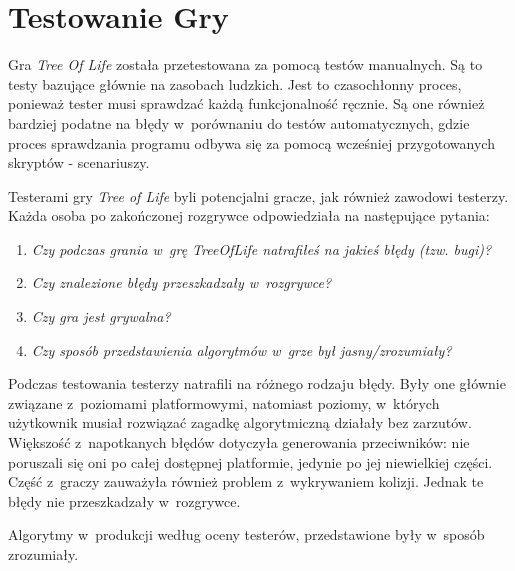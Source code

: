 \documentclass[12pt,a4paper,oneside]{book}
\theoremstyle{definition}
\numberwithin{equation}{chapter}
\begin{document}
\section{Testowanie Gry}
\par Gra \textit{Tree Of Life} została przetestowana za pomocą testów manualnych. Są to testy bazujące głównie na zasobach ludzkich. Jest to czasochłonny proces, ponieważ tester musi sprawdzać każdą funkcjonalność ręcznie. Są one również bardziej podatne na błędy w~porównaniu do testów automatycznych, gdzie proces sprawdzania programu odbywa się za pomocą wcześniej przygotowanych skryptów - scenariuszy.
\par Testerami gry \textit{Tree of Life} byli potencjalni gracze, jak również zawodowi testerzy. Każda osoba po zakończonej rozgrywce odpowiedziała na następujące pytania:
\begin{enumerate}
    \item \textit{Czy podczas grania w~grę TreeOfLife natrafiłeś na jakieś błędy (tzw. bugi)?}
    \item \textit{Czy znalezione błędy przeszkadzały w~rozgrywce?}
    \item \textit{Czy gra jest grywalna?}
    \item \textit{Czy sposób przedstawienia algorytmów w~grze był jasny/zrozumiały?}
\end{enumerate}
\par Podczas testowania testerzy natrafili na różnego rodzaju błędy. Były one głównie związane z~poziomami platformowymi, natomiast poziomy, w~których użytkownik musiał rozwiązać zagadkę algorytmiczną działały bez zarzutów. Większość z~napotkanych błędów dotyczyła generowania przeciwników: nie poruszali się oni po całej dostępnej platformie, jedynie po jej niewielkiej części. Część z~graczy zauważyła również problem z~wykrywaniem kolizji. Jednak te błędy nie przeszkadzały w~rozgrywce.
\par Algorytmy w~produkcji według oceny testerów, przedstawione były w~sposób zrozumiały.


\end{document}
